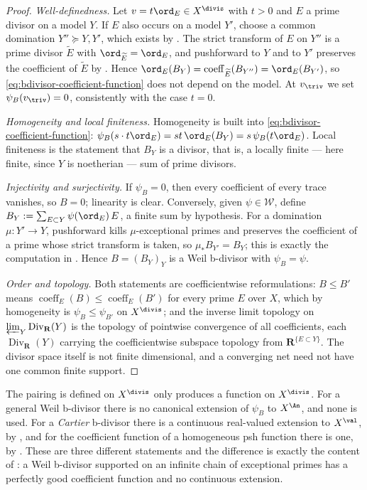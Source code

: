 \begin{proof}
\emph{Well-definedness.}  Let $v=t\ord_E\in X^{\divis}$ with $t>0$ and
$E$ a prime divisor on a model $Y$.  If $E$ also occurs on a model
$Y'$, choose a common domination $Y''\succeq Y,Y'$, which exists by
.  The strict transform of $E$ on
$Y''$ is a prime divisor $\widetilde E$ with
$\ord_{\widetilde E}=\ord_E$, and pushforward to $Y$ and to $Y'$
preserves the coefficient of $\widetilde E$ by
.  Hence
$\ord_E(B_Y)=\operatorname{coeff}_{\widetilde E}(B_{Y''})=\ord_E(B_{Y'})$,
so \eqref{eq:bdivisor-coefficient-function} does not depend on the model.
At $v_{\triv}$ we set $\psi_B(v_{\triv})=0$, consistently with the case
$t=0$.

\emph{Homogeneity and local finiteness.}  Homogeneity is built into
\eqref{eq:bdivisor-coefficient-function}: $\psi_B(s\cdot t\ord_E)
=st\,\ord_E(B_Y)=s\,\psi_B(t\ord_E)$.  Local finiteness is the statement
that $B_Y$ is a divisor, that is, a locally finite --- here finite, since
$Y$ is noetherian --- sum of prime divisors.

\emph{Injectivity and surjectivity.}  If $\psi_B=0$, then every
coefficient of every trace vanishes, so $B=0$; linearity is clear.
Conversely, given $\psi\in\mathcal W$, define
$B_Y:=\sum_{E\subset Y}\psi(\ord_E)\,E$, a finite sum by hypothesis.  For a
domination $\mu:Y'\to Y$, pushforward kills $\mu$-exceptional primes and
preserves the coefficient of a prime whose strict transform is taken, so
$\mu_*B_{Y'}=B_Y$; this is exactly the computation in
.  Hence $B=(B_Y)_Y$ is a Weil b-divisor with
$\psi_B=\psi$.

\emph{Order and topology.}  Both statements are coefficientwise
reformulations: $B\leq B'$ means
$\operatorname{coeff}_E(B)\leq\operatorname{coeff}_E(B')$ for every prime
$E$ over $X$, which by homogeneity is
$\psi_B\leq\psi_{B'}$ on $X^{\divis}$; and the inverse limit topology on
$\varprojlim_Y\operatorname{Div}_{\mathbf R}(Y)$ is the topology of
pointwise convergence of all coefficients, each $\operatorname{Div}_{\mathbf R}(Y)$ carrying the coefficientwise
subspace topology from $\mathbf R^{\{E\subset Y\}}$. The divisor space
itself is not finite dimensional, and a converging net need not have
one common finite support.
\end{proof}

\begin{warning}{The pairing is defined on $X^{\divis}$ only}
 produces a function on
$X^{\divis}$.  For a general Weil b-divisor there is no canonical
extension of $\psi_B$ to $X^{\An}$, and none is used.  For a
\emph{Cartier} b-divisor there is a continuous real-valued extension to
$X^{\val}$, by , and for the coefficient
function of a homogeneous psh function there is one, by
.  These are three different
statements and the difference is exactly the content of
: a Weil b-divisor supported on an
infinite chain of exceptional primes has a perfectly good coefficient
function and no continuous extension.
\end{warning}

